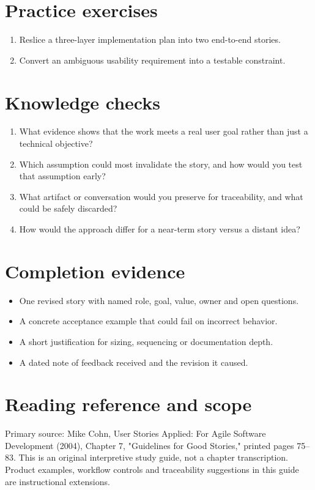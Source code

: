 \documentclass[11pt,letterpaper]{article}
\begin{document}
\section{Practice exercises}
\begin{enumerate}[leftmargin=*,itemsep=3pt]
\item Reslice a three-layer implementation plan into two end-to-end stories.
\item Convert an ambiguous usability requirement into a testable constraint.
\end{enumerate}
\section{Knowledge checks}
\begin{enumerate}[leftmargin=*,itemsep=3pt]
\item What evidence shows that the work meets a real user goal rather than just a technical objective?
\item Which assumption could most invalidate the story, and how would you test that assumption early?
\item What artifact or conversation would you preserve for traceability, and what could be safely discarded?
\item How would the approach differ for a near-term story versus a distant idea?
\end{enumerate}
\section{Completion evidence}
\begin{itemize}[leftmargin=*,itemsep=2pt]
\item One revised story with named role, goal, value, owner and open questions.
\item A concrete acceptance example that could fail on incorrect behavior.
\item A short justification for sizing, sequencing or documentation depth.
\item A dated note of feedback received and the revision it caused.
\end{itemize}
\section{Reading reference and scope}
Primary source: Mike Cohn, User Stories Applied: For Agile Software Development (2004), Chapter 7, "Guidelines for Good Stories," printed pages 75–83. This is an original interpretive study guide, not a chapter transcription. Product examples, workflow controls and traceability suggestions in this guide are instructional extensions.
\end{document}

